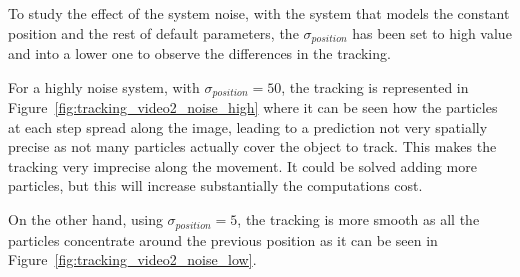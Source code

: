\documentclass{ethz_report}
\begin{document}
To study the effect of the system noise, with the system that models the constant position and the rest of default parameters, the $\sigma_{position}$ has been set to high value and into a lower one to observe the differences in the tracking.

For a highly noise system, with $\sigma_{position} = 50$, the tracking is represented in Figure~\ref{fig:tracking_video2_noise_high} where it can be seen how the particles at each step spread along the image, leading to a prediction not very spatially precise as not many particles actually cover the object to track.
This makes the tracking very imprecise along the movement. It could be solved adding more particles, but this will increase substantially the computations cost.

On the other hand, using $\sigma_{position} = 5$, the tracking is more smooth as all the particles concentrate around the previous position as it can be seen in Figure~\ref{fig:tracking_video2_noise_low}.
\end{document}
